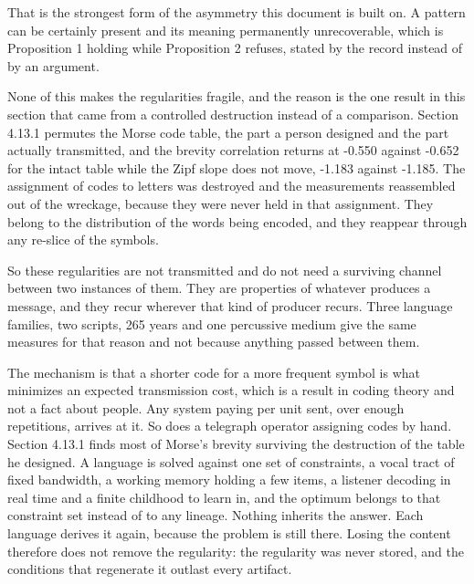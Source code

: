 That is the strongest form of the asymmetry this document is built on. A pattern can be certainly present and its meaning permanently unrecoverable, which is Proposition 1 holding while Proposition 2 refuses, stated by the record instead of by an argument.

None of this makes the regularities fragile, and the reason is the one result in this section that came from a controlled destruction instead of a comparison. Section 4.13.1 permutes the Morse code table, the part a person designed and the part actually transmitted, and the brevity correlation returns at -0.550 against -0.652 for the intact table while the Zipf slope does not move, -1.183 against -1.185. The assignment of codes to letters was destroyed and the measurements reassembled out of the wreckage, because they were never held in that assignment. They belong to the distribution of the words being encoded, and they reappear through any re-slice of the symbols.

So these regularities are not transmitted and do not need a surviving channel between two instances of them. They are properties of whatever produces a message, and they recur wherever that kind of producer recurs. Three language families, two scripts, 265 years and one percussive medium give the same measures for that reason and not because anything passed between them.

The mechanism is that a shorter code for a more frequent symbol is what minimizes an expected transmission cost, which is a result in coding theory and not a fact about people. Any system paying per unit sent, over enough repetitions, arrives at it. So does a telegraph operator assigning codes by hand. Section 4.13.1 finds most of Morse's brevity surviving the destruction of the table he designed. A language is solved against one set of constraints, a vocal tract of fixed bandwidth, a working memory holding a few items, a listener decoding in real time and a finite childhood to learn in, and the optimum belongs to that constraint set instead of to any lineage. Nothing inherits the answer. Each language derives it again, because the problem is still there. Losing the content therefore does not remove the regularity: the regularity was never stored, and the conditions that regenerate it outlast every artifact.

